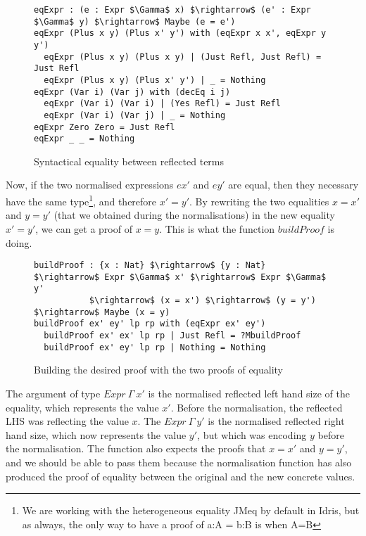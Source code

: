\begin{figure}[H]
\figrule
\begin{center}
\begin{lstlisting}
eqExpr : (e : Expr $\Gamma$ x) $\rightarrow$ (e' : Expr $\Gamma$ y) $\rightarrow$ Maybe (e = e')
eqExpr (Plus x y) (Plus x' y') with (eqExpr x x', eqExpr y y')
  eqExpr (Plus x y) (Plus x y) | (Just Refl, Just Refl) = Just Refl
  eqExpr (Plus x y) (Plus x' y') | _ = Nothing
eqExpr (Var i) (Var j) with (decEq i j)
  eqExpr (Var i) (Var i) | (Yes Refl) = Just Refl
  eqExpr (Var i) (Var j) | _ = Nothing
eqExpr Zero Zero = Just Refl
eqExpr _ _ = Nothing
\end{lstlisting}
\end{center}
\caption{Syntactical equality between reflected terms}
\figrule
\end{figure}


Now, if the two normalised expressions $ex'$ and $ey'$ are equal, then they necessary have the same type\footnote{We are working with the heterogeneous equality JMeq by default in Idris, but as always, the only way to have a proof of a:A = b:B is when A=B}, and therefore $x'=y'$.
By rewriting the two equalities $x=x'$ and $y=y'$ (that we obtained during the normalisations) in the new equality $x'=y'$, we can get a proof of $x=y$. This is what the function $buildProof$ is doing.

\begin{figure}[H]
\figrule
\begin{center}
\begin{lstlisting}
buildProof : {x : Nat} $\rightarrow$ {y : Nat} $\rightarrow$ Expr $\Gamma$ x' $\rightarrow$ Expr $\Gamma$ y' 
           $\rightarrow$ (x = x') $\rightarrow$ (y = y') $\rightarrow$ Maybe (x = y)
buildProof ex' ey' lp rp with (eqExpr ex' ey')
  buildProof ex' ex' lp rp | Just Refl = ?MbuildProof
  buildProof ex' ey' lp rp | Nothing = Nothing
\end{lstlisting}
\end{center}
\caption{Building the desired proof with the two proofs of equality}
\figrule
\end{figure}

The argument of type $Expr\ \Gamma\ x'$ is the normalised reflected left hand size of the equality, which represents the value $x'$. Before the normalisation, the reflected LHS was reflecting the value $x$. The $Expr\ \Gamma\ y'$ is the normalised reflected right hand size, which now represents the value $y'$, but which was encoding $y$ before the normalisation. The function also expects the proofs that $x=x'$ and $y=y'$, and we should be able to pass them because the normalisation function has also produced the proof of equality between the original and the new concrete values.

